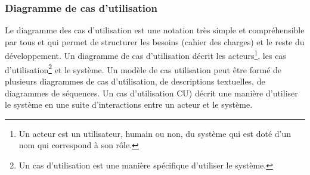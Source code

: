 			\subsubsection{Diagramme de cas d'utilisation}
				Le diagramme des cas d’utilisation est une notation très simple et compréhensible par tous et qui permet de structurer les besoins (cahier des charges) et le reste du développement. Un diagramme de cas d’utilisation décrit les acteurs\footnote{ Un acteur est un utilisateur, humain ou non, du système qui est doté d’un nom qui correspond à son rôle.}, les cas d’utilisation\footnote{Un cas d’utilisation est une manière spécifique d’utiliser le système.} et le système. Un modèle de cas
utilisation peut être formé de plusieurs diagrammes de cas d'utilisation, de descriptions textuelles, de diagrammes de séquences. Un cas d’utilisation CU) décrit une manière d’utiliser le système en une suite d’interactions entre un acteur et le système.
